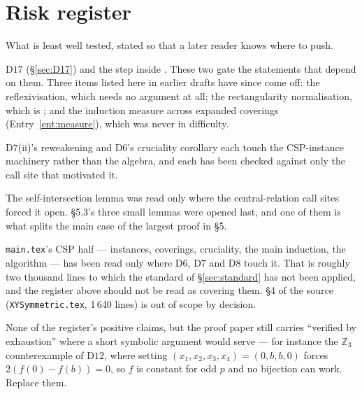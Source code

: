 \section{Risk register}\label{sec:risk}

What is least well tested, stated so that a later reader knows where to push.

\begin{description}\tightlist
\item[Open mathematics.] $\mathrm D17$ (\S\ref{sec:D17}) and the step
   inside .
  These two gate the statements that depend on them. Three items listed here in earlier drafts
  have since come off: the reflexivisation, which needs no argument at all; the
  rectangularity normalisation, which is ; and the
  induction measure across expanded coverings (Entry~\ref{ent:measure}), which
  was never in difficulty.

\item[Least-tested repairs.] $\mathrm D7$(ii)'s reweakening and $\mathrm D6$'s
  cruciality corollary each touch the CSP-instance machinery rather than the
  algebra, and each has been checked against only the call site that motivated
  it.

\item[Least-tested positive verdicts.] The self-intersection lemma was read only
  where the central-relation call sites forced it open. \S5.3's three small
  lemmas were opened last, and one of them is what splits the main case of the
  largest proof in \S5.

\item[Unread.] \texttt{main.tex}'s CSP half --- instances, coverings,
  cruciality, the main induction, the algorithm --- has been read only where
  $\mathrm D6$, $\mathrm D7$ and $\mathrm D8$ touch it. That is roughly two
  thousand lines to which the standard of \S\ref{sec:standard} has not been
  applied, and the register above should not be read as covering them. \S4 of
  the source (\texttt{XYSymmetric.tex}, 1\,640 lines) is out of scope by
  decision.

\item[Claims resting on exhaustion alone.] None of the register's positive
  claims, but the proof paper still carries ``verified by exhaustion'' where a
  short symbolic argument would serve --- for instance the $\mathbb Z_{3}$
  counterexample of $\mathrm D12$, where setting
  $(x_{1},x_{2},x_{3},x_{4})=(0,b,b,0)$ forces $2(f(0)-f(b))=0$, so $f$ is
  constant for odd $p$ and no bijection can work. Replace them.
\end{description}

